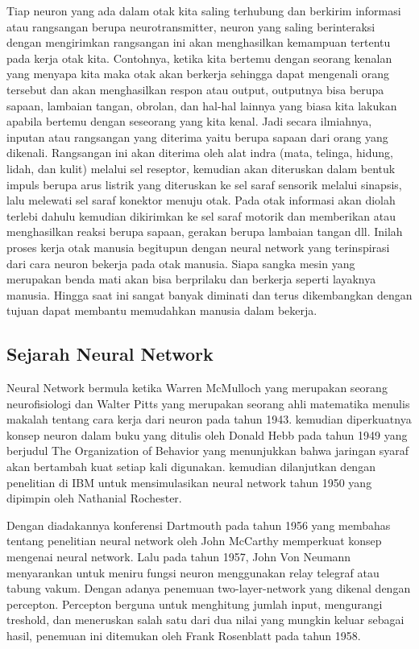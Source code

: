 Tiap neuron yang ada dalam otak kita saling terhubung dan berkirim informasi atau rangsangan berupa neurotransmitter, neuron yang saling berinteraksi dengan mengirimkan rangsangan ini akan menghasilkan kemampuan tertentu pada kerja otak kita. Contohnya, ketika kita bertemu dengan seorang kenalan yang menyapa kita maka otak akan berkerja sehingga dapat mengenali orang tersebut dan akan menghasilkan respon atau output, outputnya bisa berupa sapaan, lambaian tangan, obrolan, dan hal-hal lainnya yang biasa kita lakukan apabila bertemu dengan seseorang yang kita kenal. Jadi secara ilmiahnya, inputan atau rangsangan yang diterima yaitu berupa sapaan dari orang yang dikenali. Rangsangan ini akan diterima oleh alat indra (mata, telinga, hidung, lidah, dan kulit) melalui sel reseptor, kemudian akan diteruskan dalam bentuk impuls berupa arus listrik yang diteruskan ke sel saraf sensorik melalui sinapsis, lalu melewati sel saraf konektor menuju otak. Pada otak informasi akan diolah terlebi dahulu kemudian dikirimkan ke sel saraf motorik dan memberikan atau menghasilkan reaksi berupa sapaan, gerakan berupa lambaian tangan dll. Inilah proses kerja otak manusia begitupun dengan neural network yang terinspirasi dari cara neuron bekerja pada otak manusia. Siapa sangka mesin yang merupakan benda mati akan bisa berprilaku dan berkerja seperti layaknya manusia. Hingga saat ini sangat banyak diminati dan terus dikembangkan dengan tujuan dapat membantu memudahkan manusia dalam bekerja.

\subsection{Sejarah Neural Network}
Neural Network bermula ketika Warren McMulloch yang merupakan seorang neurofisiologi dan Walter Pitts yang merupakan seorang ahli matematika menulis makalah tentang cara kerja dari neuron pada tahun 1943. kemudian diperkuatnya konsep neuron dalam buku yang ditulis oleh Donald Hebb pada tahun 1949 yang berjudul The Organization of Behavior yang menunjukkan bahwa jaringan syaraf akan bertambah kuat setiap kali digunakan. kemudian dilanjutkan dengan penelitian di IBM untuk mensimulasikan neural network tahun 1950 yang dipimpin oleh Nathanial Rochester.

Dengan diadakannya konferensi Dartmouth pada tahun 1956 yang membahas tentang penelitian neural network oleh John McCarthy memperkuat konsep mengenai neural network. Lalu pada tahun 1957, John Von Neumann menyarankan untuk meniru fungsi neuron menggunakan relay telegraf atau tabung vakum. Dengan adanya penemuan two-layer-network yang dikenal dengan percepton. Percepton berguna untuk menghitung jumlah input, mengurangi treshold, dan meneruskan salah satu dari dua nilai yang mungkin keluar sebagai hasil, penemuan ini ditemukan oleh Frank Rosenblatt pada tahun 1958. 

